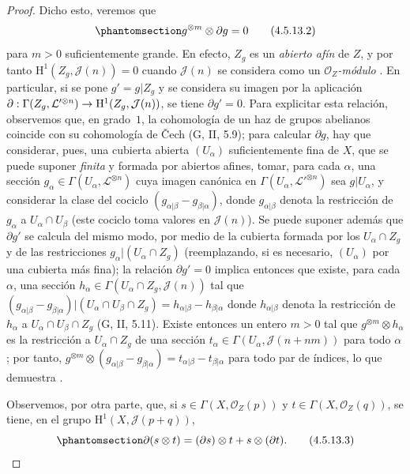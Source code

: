 \documentclass[oneside,10pt]{amsart}
\makeatletter
\newcommand{\ega@arrow}[2]{\mathchoice{#1}{#2}{#2}{#2}}
\renewcommand{\to}{\ega@arrow{\longrightarrow}{\rightarrow}}
\let\EGAOriginalLabel\label
\renewcommand{\label}[1]{\phantomsection\EGAOriginalLabel{#1}}
\makeatother
\begin{document}
\begin{proof}
  Dicho esto, veremos que
  \begin{equation}
\label{II.4.5.13.2-fr}
  g^{\otimes m}\otimes\partial g=0
\tag{4.5.13.2}
\end{equation}
  para $m>0$ suficientemente grande.
  En efecto, $Z_g$ es un \emph{abierto afín} de $Z$, y por tanto $\mathrm{H}^1(Z_g,\mathcal{J}(n))=0$ cuando $\mathcal{J}(n)$ se considera como un \emph{$\mathcal{O}_Z$-módulo} .
  En particular, si se pone $g'=g|Z_g$ y se considera su imagen por la aplicación $\partial:\Gamma(Z_g,\mathcal{L}'^{\otimes n})\to
\mathrm{H}^1(Z_g,\mathcal{J}(n))$, se tiene $\partial g'=0$.
  Para explicitar esta relación, observemos que, en grado~$1$, la cohomología de un haz de grupos abelianos coincide con su cohomología de \v{C}ech (G, II, 5.9);
  para calcular $\partial g$, hay que considerar, pues, una cubierta abierta $(U_\alpha)$ suficientemente fina de $X$, que se puede suponer \emph{finita} y formada por abiertos afines, tomar, para cada $\alpha$, una sección $g_\alpha\in\Gamma(U_\alpha,\mathcal{L}^{\otimes n})$ cuya imagen canónica en $\Gamma(U_\alpha,\mathcal{L}'^{\otimes n})$ sea $g|U_\alpha$, y considerar la clase del cociclo $(g_{\alpha|\beta}-g_{\beta|\alpha})$, donde $g_{\alpha|\beta}$ denota la restricción de $g_\alpha$ a $U_\alpha\cap U_\beta$ (este cociclo toma valores en $\mathcal{J}(n)$).
  Se puede suponer además que $\partial g'$ se calcula del mismo modo, por medio de la cubierta formada por los $U_\alpha\cap Z_g$ y de las restricciones $g_\alpha|(U_\alpha\cap Z_g)$ (reemplazando, si es necesario, $(U_\alpha)$ por una cubierta más fina);
  la relación $\partial g'=0$ implica entonces que existe, para cada $\alpha$, una sección $h_\alpha\in\Gamma(U_\alpha\cap Z_g,\mathcal{J}(n))$ tal que
  $(g_{\alpha|\beta}-g_{\beta|\alpha})
|(U_\alpha\cap U_\beta\cap Z_g)
=h_{\alpha|\beta}-h_{\beta|\alpha}$
  donde $h_{\alpha|\beta}$ denota la restricción de $h_\alpha$ a $U_\alpha\cap U_\beta\cap Z_g$ (G, II, 5.11).
  Existe entonces un entero $m>0$ tal que $g^{\otimes m}\otimes h_\alpha$ es la restricción a $U_\alpha\cap Z_g$ de una sección $t_\alpha\in\Gamma(U_\alpha,\mathcal{J}(n+nm))$ para todo $\alpha$ ;
  por tanto, $g^{\otimes m}\otimes(g_{\alpha|\beta}-g_{\beta|\alpha})
=t_{\alpha|\beta}-t_{\beta|\alpha}$ para todo par de índices, lo que demuestra .

  Observemos, por otra parte, que, si $s\in\Gamma(X,\mathcal{O}_Z(p))$ y $t\in\Gamma(X,\mathcal{O}_Z(q))$, se tiene, en el grupo $\mathrm{H}^1(X,\mathcal{J}(p+q))$,
  \begin{equation}
\label{II.4.5.13.3-fr}
  \partial(s\otimes t)=(\partial s)\otimes t+s\otimes(\partial t).
\tag{4.5.13.3}
\end{equation}


\end{proof}
\end{document}
